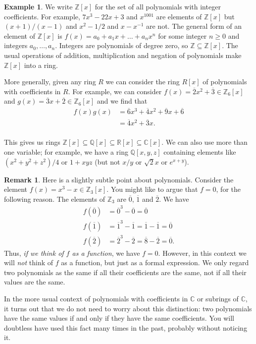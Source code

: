 \documentclass{amsart}
\newcommand{\Z}         {{\mathbb{Z}}}
\newcommand{\Q}         {{\mathbb{Q}}}
\newcommand{\R}         {{\mathbb{R}}}
\newcommand{\C}         {{\mathbb{C}}}
\newcommand{\ov}[1]     {\overline{#1}}
\newcommand{\sse}       {\subseteq}
\renewcommand{\:}{\colon}
\theoremstyle{definition}
\newtheorem{remark}[theorem]{Remark}
\newtheorem{example}[theorem]{Example}
\begin{document}
\begin{example}\label{eg-poly}
 We write $\Z[x]$ for the set of all polynomials with integer
 coefficients.  For example, $7x^3-22x+3$ and $x^{1001}$ are elements
 of $\Z[x]$ but $(x+1)/(x-1)$ and $x^2-1/2$ and $x-x^{-1}$ are not.
 The general form of an element of $\Z[x]$ is
 $f(x)=a_0+a_1x+\ldots+a_nx^n$ for some integer $n\geq 0$ and integers
 $a_0,\ldots,a_n$.  Integers are polynomials of degree zero, so
 $\Z\sse\Z[x]$.  The usual operations of addition, multiplication and
 negation of polynomials make $\Z[x]$ into a ring.

 More generally, given any ring $R$ we can consider the ring $R[x]$ of
 polynomials with coefficients in $R$.  For example, we can consider
 $f(x)=\ov{2}x^2+\ov{3}\in\Z_6[x]$ and $g(x)=\ov{3}x+\ov{2}\in\Z_6[x]$
 and we find that 
 \begin{align*}
  f(x)g(x) &= \ov{6} x^3 + \ov{4} x^2 + \ov{9} x + \ov{6} \\
           &= \ov{4} x^2 + \ov{3} x.\\
 \end{align*}
 
 This gives us rings $\Z[x]\sse\Q[x]\sse\R[x]\sse\C[x]$.  We can also
 use more than one variable; for example, we have a ring $\Q[x,y,z]$
 containing elements like $(x^2+y^2+z^2)/4$ or $1+xyz$ (but not $x/y$
 or $\sqrt{2}x$ or $e^{x+y}$).
\end{example}
\begin{remark}
 Here is a slightly subtle point about polynomials.  Consider the
 element $f(x)=x^3-x\in\Z_3[x]$.  You might like to argue that $f=0$,
 for the following reason.  The elements of $\Z_3$ are $\ov{0}$,
 $\ov{1}$ and $\ov{2}$.  We have 
 \begin{align*}
  f(\ov{0}) &= \ov{0}^3 - \ov{0} = \ov{0} \\
  f(\ov{1}) &= \ov{1}^3 - \ov{1} = \ov{1} - \ov{1} = \ov{0} \\
  f(\ov{2}) &= \ov{2}^3 - \ov{2} = \ov{8} - \ov{2} = \ov{0}.
 \end{align*}
 Thus, \emph{if we think of $f$ as a function}, we have $f=0$.
 However, in this context we will \emph{not} think of $f$ as a
 function, but just as a formal expression.  We only regard two
 polynomials as the same if all their coefficients are the same, not
 if all their values are the same.  

 In the more usual context of polynomials with coefficients in $\C$ or
 subrings of $\C$, it turns out that we do not need to worry about
 this distinction: two polynomials have the same values if and only if
 they have the same coefficients.  You will doubtless have used this
 fact many times in the past, probably without noticing it.
\end{remark}
\end{document}

